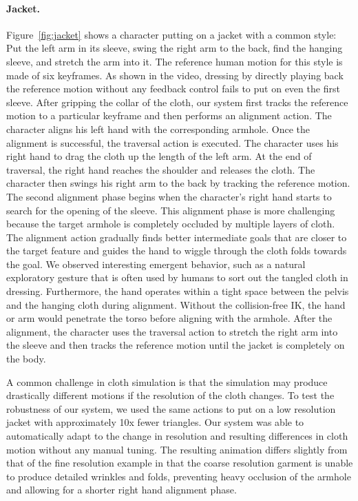 \paragraph{Jacket.} Figure~\ref{fig:jacket} shows a character putting on a jacket with a common style: Put the left arm in its sleeve, swing the right arm to the back, find the hanging sleeve, and stretch the arm into it. The reference human motion for this style is made of six keyframes. As shown in the video, dressing by directly playing back the reference motion without any feedback control fails to put on even the first sleeve. After gripping the collar of the cloth, our system first tracks the reference motion to a particular keyframe and then performs an alignment action. The character aligns his left hand with the corresponding armhole. Once the alignment is successful, the traversal action is executed. The character uses his right hand to drag the cloth up the length of the left arm. At the end of traversal, the right hand reaches the shoulder and releases the cloth. The character then swings his right arm to the back by tracking the reference motion. The second alignment phase begins when the character's right hand starts to search for the opening of the sleeve. This alignment phase is more challenging because the target armhole is completely occluded by multiple layers of cloth. The alignment action gradually finds better intermediate goals that are closer to the target feature and guides the hand to wiggle through the cloth folds towards the goal. We observed interesting emergent behavior, such as a natural exploratory gesture that is often used by humans to sort out the tangled cloth in dressing. Furthermore, the hand operates within a tight space between the pelvis and the hanging cloth during alignment. Without the collision-free IK, the hand or arm would penetrate the torso before aligning with the armhole. After the alignment, the character uses the traversal action to stretch the right arm into the sleeve and then tracks the reference motion until the jacket is completely on the body. 

A common challenge in cloth simulation is that the simulation may produce drastically different motions if the resolution of the cloth changes. To test the robustness of our system, we used the same actions to put on a low resolution jacket with approximately 10x fewer triangles. Our system was able to automatically adapt to the change in resolution and resulting differences in cloth motion without any manual tuning. The resulting animation differs slightly from that of the fine resolution example in that the coarse resolution garment is unable to produce detailed wrinkles and folds, preventing heavy occlusion of the armhole and allowing for a shorter right hand alignment phase.

